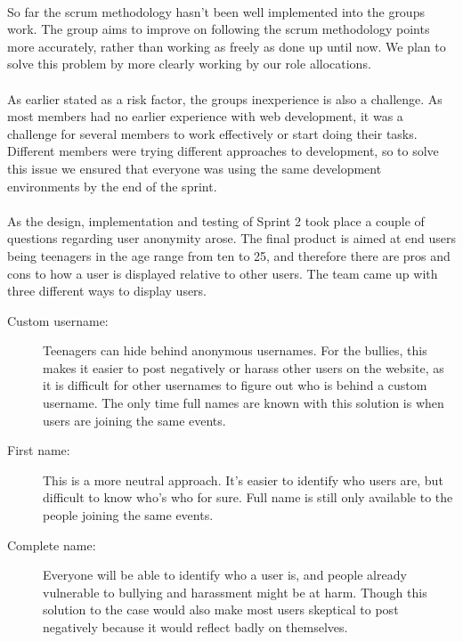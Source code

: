 \paragraph{} So far the scrum methodology hasn’t been well implemented into the groups work. The group aims to improve on following the scrum methodology points more accurately, rather than working as freely as done up until now. We plan to solve this problem by more clearly working by our role allocations. 

\paragraph{} As earlier stated as a risk factor, the groups inexperience is also a challenge. As most members had no earlier experience with web development, it was a challenge for several members to work effectively or start doing their tasks. Different members were trying different approaches to development, so to solve this issue we ensured that everyone was using the same development environments by the end of the sprint. 

\paragraph{} As the design, implementation and testing of Sprint 2 took place a couple of questions regarding user anonymity arose. The final product is aimed at end users being teenagers in the age range from ten to 25, and therefore there are pros and cons to how a user is displayed relative to other users. The team came up with three different ways to display users. 

\begin{description}
\item[Custom username: ] Teenagers can hide behind anonymous usernames. For the bullies, this makes it easier to post negatively or harass other users on the website, as it is difficult for other usernames to figure out who is behind a custom username. The only time full names are known with this solution is when users are joining the same events. 
\item[First name: ] This is a more neutral approach. It's easier to identify who users are, but difficult to know who's who for sure. Full name is still only available to the people joining the same events. 
\item[Complete name: ] Everyone will be able to identify who a user is, and people already vulnerable to bullying and harassment might be at harm. Though this solution to the case would also make most users skeptical to post negatively because it would reflect badly on themselves. 
\end{description}



